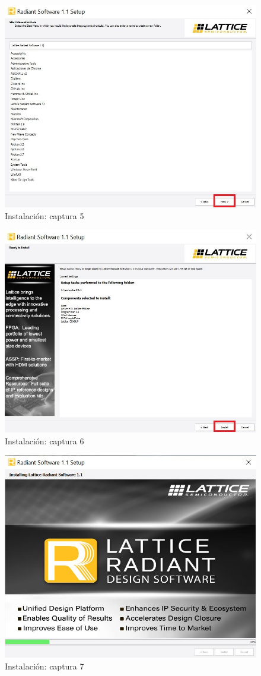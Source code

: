 \documentclass{article}
\begin{document}
\begin{figure}[H]
\centering
\includegraphics[width=0.8\linewidth]{Imagenes/inst5.JPG}
\caption{Instalación: captura 5 }
\label{fig:install}
\end{figure}

\begin{figure}[H]
\centering
\includegraphics[width=0.8\linewidth]{Imagenes/inst6.JPG}
\caption{Instalación: captura 6 }
\label{fig:install}
\end{figure}


\begin{figure}[H]
\centering
\includegraphics[width=0.8\linewidth]{Imagenes/inst7.JPG}
\caption{Instalación: captura 7 }
\label{fig:install}
\end{figure}
\end{document}
